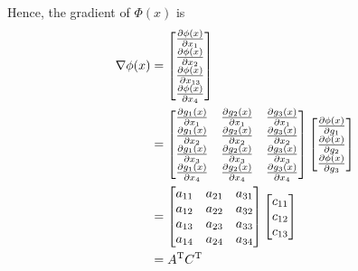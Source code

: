 Hence, the gradient of $\Phi (x)$ is
\begin{align*}
\nabla \phi (x) &=
\left[\begin{matrix}
\frac{\partial \phi (x)}{\partial x_{1}}\\
\frac{\partial \phi (x)}{\partial x_{2}}\\
\frac{\partial \phi (x)}{\partial x_{13}}\\
\frac{\partial \phi (x)}{\partial x_{4}}\\
\end{matrix}\right]\\
&=
\left[\begin{matrix}
\frac{\partial g_{1}(x)}{\partial x_{1}}&\frac{\partial g_{2}(x)}{\partial x_{1}}&\frac{\partial g_{3}(x)}{\partial x_{1}}\\
\frac{\partial g_{1}(x)}{\partial x_{2}}&\frac{\partial g_{2}(x)}{\partial x_{2}}&\frac{\partial g_{3}(x)}{\partial x_{2}}\\
\frac{\partial g_{1}(x)}{\partial x_{3}}&\frac{\partial g_{2}(x)}{\partial x_{3}}&\frac{\partial g_{3}(x)}{\partial x_{3}}\\
\frac{\partial g_{1}(x)}{\partial x_{4}}&\frac{\partial g_{2}(x)}{\partial x_{4}}&\frac{\partial g_{3}(x)}{\partial x_{4}}
\end{matrix}\right]
\left[\begin{matrix}
\frac{\partial \phi (x)}{\partial g_{1}}\\
\frac{\partial \phi (x)}{\partial g_{2}}\\
\frac{\partial \phi (x)}{\partial g_{3}}\\
\end{matrix}\right]\\
&=
\left[\begin{matrix}
a_{11}&a_{21}&a_{31}\\
a_{12}&a_{22}&a_{32}\\
a_{13}&a_{23}&a_{33}\\
a_{14}&a_{24}&a_{34}\\
\end{matrix}\right]
\left[\begin{matrix}
c_{11}\\
c_{12}\\
c_{13}\\
\end{matrix}\right]\\
&=
A^{{\rm T}}C^{{\rm T}}\\
\end{align*}

